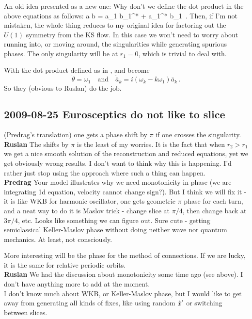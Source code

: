 \vspace{2ex}
An old idea presented as a new one:  Why don't we define the dot product in the above equations as follows:
\beq
 a \cdot b = a_1 b_1^* + a_1^* b_1
 \,.
Then, if I'm not mistaken, the whole thing reduces to my original idea for factoring out the $U(1)$
symmetry from the KS flow.  In this case we won't need to worry about running into, or moving around,
the singularities while generating spurious phases.  The only singularity will be at $r_1 = 0$,
which is trivial to deal with.

With the dot product defined as in ,
 and  become
\[
  \dot{\theta} = \omega_1
  \quad \mathrm{and} \quad
  \dot{\bar{a}}_k = i(\omega_k - k\omega_1) \bar{a}_k
\,.
\]
So they (obvious to Ruslan) do the job.


\subsection{2009-08-25 Eurosceptics do not like to slice}
 (Predrag's translation) one gets a
phase shift by $\pi$ if one crosses the singularity.
\\
{\bf Ruslan} The shifts by $\pi$ is the least of my worries.
It is the fact that when $r_2 > r_1$ we get a nice smooth
solution of the reconstruction and reduced equations, yet we
get obviously wrong results.  I don't want to think why this
is happening.  I'd rather just stop using the approach where
such a thing can happen.
\\
{\bf Predrag} Your model illustrates why we need
monotonicity in phase (we are integrating 1d equation,
velocity cannot change sign?). But I think we will fix it -
it is like WKB for harmonic oscillator, one gets geometric
$\pi$ phase for each turn, and a neat way to do it is Maslov
trick - change slice at $\pi/4$, then change back at
$3\pi/4$, etc. Looks like something we can figure out. Sure
cute - getting semiclassical Keller-Maslov phase without
doing neither wave nor quantum mechanics. At least, not
consciously.

More interesting will be the phase for the method of
connections. If we are lucky, it is the same for relative
periodic orbits.
\\
{\bf Ruslan} We had the discussion about monotonicity some
time ago (see above).  I don't have anything more to add at
the moment.
\\
I don't know much about WKB, or Keller-Maslov
phase, but I would like to get away from generating all kinds
of fixes, like using random ${\hat{x}'}$ or switching between
slices.

